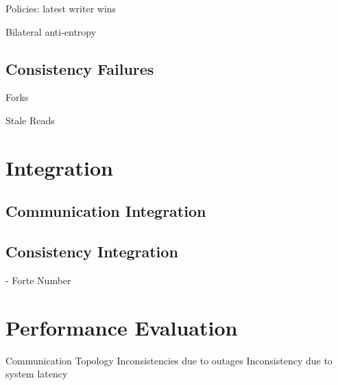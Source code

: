 Policies: latest writer wins

Bilateral anti-entropy

\subsection{Consistency Failures}

Forks

Stale Reads

\section{Integration}

\subsection{Communication Integration}

\subsection{Consistency Integration}

- Forte Number

\section{Performance Evaluation}

Communication Topology
Inconsistencies due to outages
Inconsistency due to system latency
